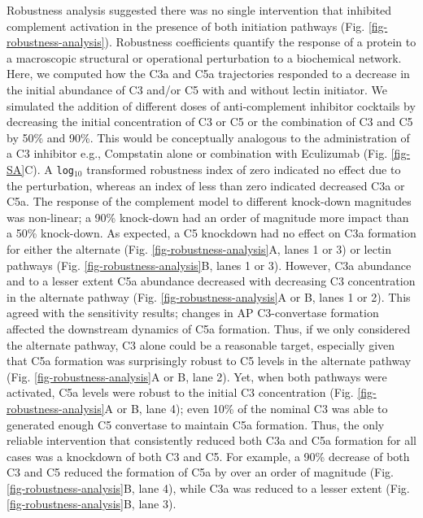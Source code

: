 \documentclass[12pt]{article}
\begin{document}
Robustness analysis suggested there was no single intervention that inhibited complement activation in the presence of both initiation pathways (Fig. \ref{fig-robustness-analysis}).
Robustness coefficients quantify the response of a protein to a macroscopic structural or operational perturbation to a biochemical network.
Here, we computed how the C3a and C5a trajectories responded to a decrease in the initial abundance of C3 and/or C5 with and without lectin initiator.
We simulated the addition of different doses of anti-complement inhibitor cocktails by decreasing the initial concentration of C3 or C5 or the combination of C3 and C5 by 50\% and 90\%.
This would be conceptually analogous to the administration of a C3 inhibitor e.g., Compstatin alone or combination with Eculizumab (Fig. \ref{fig-SA}C).
A \texttt{log$_{10}$} transformed robustness index of zero indicated no effect due to the perturbation, whereas an index of less than zero indicated decreased C3a or C5a.
The response of the complement model to different knock-down magnitudes was non-linear; a 90\% knock-down had an order of magnitude more impact than a 50\% knock-down.
As expected, a C5 knockdown had no effect on C3a formation for either the alternate (Fig. \ref{fig-robustness-analysis}A, lanes 1 or 3) or lectin pathways
(Fig. \ref{fig-robustness-analysis}B, lanes 1 or 3).
However, C3a abundance and to a lesser extent C5a abundance decreased with decreasing C3 concentration in the alternate pathway (Fig. \ref{fig-robustness-analysis}A or B, lanes 1 or 2).
This agreed with the sensitivity results; changes in AP C3-convertase formation affected the downstream dynamics of C5a formation.
Thus, if we only considered the alternate pathway, C3 alone could be a reasonable target, especially given that C5a formation was surprisingly robust to C5 levels in the alternate pathway (Fig. \ref{fig-robustness-analysis}A or B, lane 2).
Yet, when both pathways were activated, C5a levels were robust to the initial C3 concentration (Fig. \ref{fig-robustness-analysis}A or B, lane 4);
even 10\% of the nominal C3 was able to generated enough C5 convertase to maintain C5a formation.
Thus, the only reliable intervention that consistently reduced both C3a and C5a formation for all cases was a knockdown of both C3 and C5.
For example, a 90\% decrease of both C3 and C5 reduced the formation of C5a by over an order of magnitude (Fig. \ref{fig-robustness-analysis}B, lane 4),
while C3a was reduced to a lesser extent (Fig. \ref{fig-robustness-analysis}B, lane 3).
\end{document}
